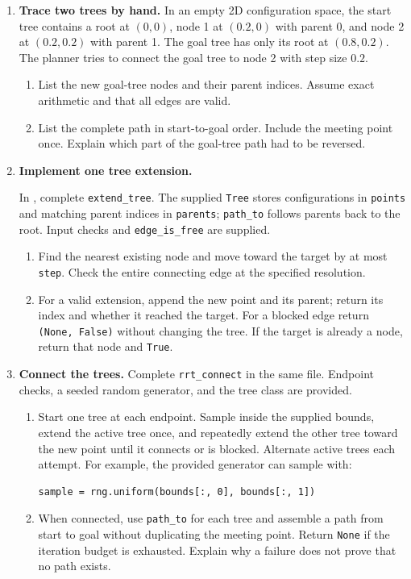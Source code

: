 \begin{enumerate}
\item \textbf{Trace two trees by hand.}
In an empty 2D configuration space, the start tree contains a root at
$(0,0)$, node 1 at $(0.2,0)$ with parent 0, and node 2 at $(0.2,0.2)$ with
parent 1. The goal tree has only its root at $(0.8,0.2)$. The planner tries
to connect the goal tree to node 2 with step size $0.2$.
\begin{enumerate}
\item List the new goal-tree nodes and their parent indices. Assume exact
arithmetic and that all edges are valid.
\item List the complete path in start-to-goal order. Include the meeting
point once. Explain which part of the goal-tree path had to be reversed.
\end{enumerate}

\item \textbf{Implement one tree extension.}\par
In , complete \texttt{extend\_tree}.
The supplied \texttt{Tree} stores configurations in \texttt{points} and
matching parent indices in \texttt{parents}; \texttt{path\_to} follows
parents back to the root. Input checks and \texttt{edge\_is\_free} are supplied.
\begin{enumerate}
\item Find the nearest existing node and move toward the target by at most
\texttt{step}. Check the entire connecting edge at the specified resolution.
\item For a valid extension, append the new point and its parent; return
its index and whether it reached the target. For a blocked edge return
\texttt{(None, False)} without changing the tree. If the target is already a
node, return that node and \texttt{True}.
\end{enumerate}

\item \textbf{Connect the trees.}
Complete \texttt{rrt\_connect} in the same file. Endpoint checks, a seeded
random generator, and the tree class are provided.
\begin{enumerate}
\item Start one tree at each endpoint. Sample inside the supplied bounds,
extend the active tree once, and repeatedly extend the other tree toward the
new point until it connects or is blocked. Alternate active trees each attempt.
For example, the provided generator can sample with:
\begin{lstlisting}
sample = rng.uniform(bounds[:, 0], bounds[:, 1])
\end{lstlisting}
\item When connected, use \texttt{path\_to} for each tree and assemble a path
from start to goal without duplicating the meeting point. Return \texttt{None}
if the iteration budget is exhausted. Explain why a failure does not prove
that no path exists.
\end{enumerate}


\end{enumerate}
